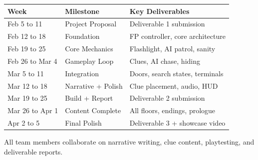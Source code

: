 \documentclass[12pt, letterpaper]{article}
\begin{document}
\begin{table}[h]
\centering
\small
\begin{tabular}{@{}p{3cm}p{4.5cm}p{5cm}@{}}
\toprule
\textbf{Week} & \textbf{Milestone} & \textbf{Key Deliverables} \\
\midrule
Feb 5 to 11 & Project Proposal & Deliverable 1 submission \\
Feb 12 to 18 & Foundation & FP controller, core architecture \\
Feb 19 to 25 & Core Mechanics & Flashlight, AI patrol, sanity \\
Feb 26 to Mar 4 & Gameplay Loop & Clues, AI chase, hiding \\
Mar 5 to 11 & Integration & Doors, search states, terminals \\
Mar 12 to 18 & Narrative + Polish & Clue placement, audio, HUD \\
Mar 19 to 25 & Build + Report & Deliverable 2 submission \\
Mar 26 to Apr 1 & Content Complete & All floors, endings, prologue \\
Apr 2 to 5 & Final Polish & Deliverable 3 + showcase video \\
\bottomrule
\end{tabular}
\end{table}

All team members collaborate on narrative writing, clue content, playtesting, and deliverable reports.
\end{document}
